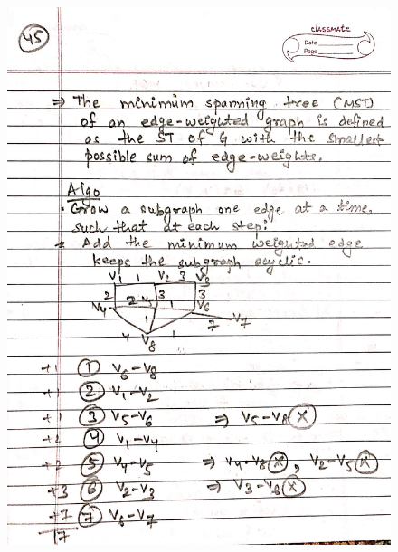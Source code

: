 \begin{figure}[H]
    \centering
    \includegraphics[scale=0.25]{"./MIT 6.042J/MIT_6042J_045"}
\end{figure}
\newpage
